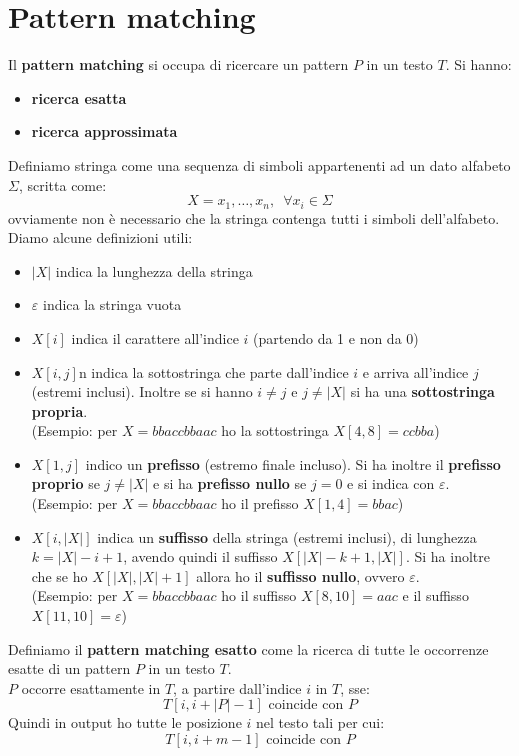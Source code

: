 \documentclass[a4paper,12pt, oneside]{book}
\begin{document}
\chapter{Pattern matching}
Il \textbf{pattern matching} si occupa di ricercare un pattern $P$ in un testo
$T$. Si hanno:
\begin{itemize}
  \item \textbf{ricerca esatta}
  \item \textbf{ricerca approssimata}
\end{itemize}
\begin{definizione}
  Definiamo stringa come una sequenza di simboli appartenenti ad un dato
  alfabeto $\Sigma$, scritta come:
  \[X=x_1,\ldots,x_n,\,\,\,\forall x_i\in \Sigma\]
  ovviamente non è necessario che la stringa contenga tutti i simboli
  dell'alfabeto.\\
  Diamo alcune definizioni utili:
  \begin{itemize}
    \item $|X|$ indica la lunghezza della stringa
    \item $\varepsilon$ indica la stringa vuota
    \item $X[i]$ indica il carattere all'indice $i$ (partendo da 1 e non da 0)
    \item $X[i,j]$n indica la sottostringa che parte dall'indice $i$ e arriva
    all'indice $j$ (estremi inclusi). Inoltre se si hanno $i\neq j$ e $j\neq
    |X|$ si ha una \textbf{sottostringa propria}.\\
    (Esempio: per $X=bbaccbbaac$ ho la sottostringa $X[4,8]=ccbba$)
    \item $X[1,j]$ indico un \textbf{prefisso} (estremo finale incluso). Si ha
    inoltre il \textbf{prefisso proprio} se $j\neq |X|$ e si ha \textbf{prefisso
      nullo} se $j=0$ e si indica con $\varepsilon$.\\
    (Esempio: per $X=bbaccbbaac$ ho il prefisso $X[1,4]=bbac$)
    \item $X[i,|X|]$ indica un \textbf{suffisso} della stringa (estremi
    inclusi), di lunghezza $k=|X|-i+1$, avendo quindi il suffisso
    $X[|X|-k+1,|X|]$. Si ha inoltre che se ho $X[|X|,|X|+1]$ 
    allora ho il \textbf{suffisso nullo}, ovvero $\varepsilon$.\\
    (Esempio: per $X=bbaccbbaac$ ho il suffisso $X[8,10]=aac$ e il suffisso
    $X[11,10]=\varepsilon$)
    
\end{itemize} 
\end{definizione}
\begin{definizione}
  Definiamo il \textbf{pattern matching esatto} come la ricerca di tutte le
  occorrenze esatte di un pattern $P$ in un testo $T$.\\
  $P$ occorre esattamente in $T$, a partire dall'indice $i$ in $T$, sse:
  \[T[i,i+|P|-1]\mbox{ coincide con }P\]
  Quindi in output ho tutte le posizione $i$ nel testo tali per cui:
  \[T[i,i+m-1]\mbox{ coincide con }P\]
\end{definizione}
\end{document}
